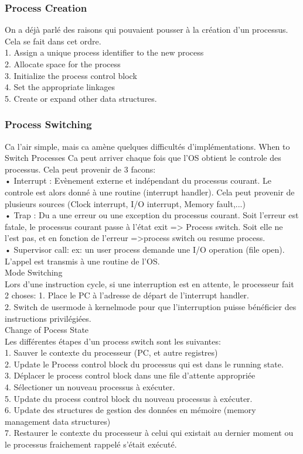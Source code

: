 \subsubsection{Process Creation}
On a déjà parlé des raisons qui pouvaient pousser à la création d’un processus. Cela se fait dans cet ordre. \\
1. Assign a unique process identifier to the new process \\
2. Allocate space for the process \\
3. Initialize the process control block \\
4. Set the appropriate linkages \\
5. Create or expand other data structures. \\
\subsubsection{Process Switching}
Ca l’air simple, mais ca amène quelques difficultés d’implémentations.
When to Switch Processes
Ca peut arriver chaque fois que l’OS obtient le controle des processus. Cela peut provenir de 3 facons: \\
• Interrupt : Evènement externe et indépendant du processus courant. Le controle est alors donné à une routine (interrupt handler). Cela peut provenir de plusieurs sources (Clock interrupt, I/O interrupt, Memory fault,...)  \\
• Trap : Du a une erreur ou une exception du processus courant. Soit l’erreur est fatale, le processus courant passe à l’état exit => Process switch. Soit elle ne l’est pas, et en fonction de l’erreur =>process switch ou resume process. \\
• Supervisor call: ex: un user process demande une I/O operation (file open). L’appel est transmis à une routine de l’OS. \\
Mode Switching \\
Lors d’une instruction cycle, si une interruption est en attente, le processeur fait 2 choses:
1. Place le PC à l’adresse de départ de l’interrupt handler. \\
2. Switch de usermode à kernelmode pour que l’interruption puisse bénéficier des instructions privilégiées. \\
Change of Pocess State \\
Les différentes étapes d’un process switch sont les suivantes: \\
1. Sauver le contexte du processeur (PC, et autre registres) \\
2. Update le Process control block du processus qui est dans le running state. \\
3. Déplacer le process control block dans une file d’attente appropriée \\
4. Sélectioner un nouveau processus à exécuter. \\
5. Update du process control block du nouveau processus à exécuter. \\
6. Update des structures de gestion des données en mémoire (memory management data structures) \\
7. Restaurer le contexte du processeur à celui qui existait au dernier moment ou le processus fraichement rappelé s’était exécuté.\\
